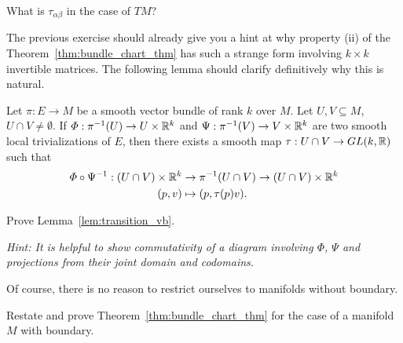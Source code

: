 \begin{exercise}
	What is $\tau_{\alpha\beta}$ in the case of $TM$?
\end{exercise}

The previous exercise should already give you a hint at why property (ii) of the Theorem~\ref{thm:bundle_chart_thm} has such a strange form involving $k\times k$ invertible matrices.
The following lemma should clarify definitively why this is natural.

\begin{lemma}\label{lem:transition_vb}
	Let $\pi:E \to M$ be a smooth vector bundle of rank $k$ over $M$. Let $U,V\subseteq M$, $U\cap V\neq \emptyset$.
	If $\varPhi : \pi^{-1}(U) \to U \times \mathbb{R}^k$ and $\Psi: \pi^{-1}(V) \to V \times \mathbb{R}^k$ are two smooth local trivializations of $E$, then there exists a smooth map $\tau: U\cap V \to GL(k, \mathbb{R})$ such that
	\begin{align}
		\varPhi\circ\Psi^{-1} : (U\cap V)\times\mathbb{R}^k & \to \pi^{-1}(U\cap V) \to (U\cap V)\times \mathbb{R}^k \\
		(p,v)                                       & \mapsto (p, \tau(p) v).
	\end{align}
\end{lemma}
\begin{exercise}
	Prove Lemma~\ref{lem:transition_vb}.

	\textit{\small Hint: It is helpful to show commutativity of a diagram involving $\varPhi$, $\Psi$ and projections from their joint domain and codomains.}
\end{exercise}

Of course, there is no reason to restrict ourselves to manifolds without boundary.
\begin{exercise}
	Restate and prove Theorem~\ref{thm:bundle_chart_thm} for the case of a manifold $M$ with boundary.
\end{exercise}

